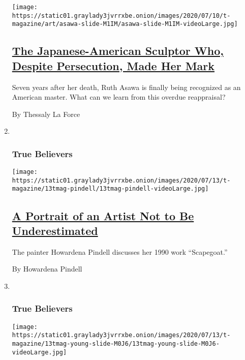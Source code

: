 \begin{enumerate}
  \texttt{[image: https://static01.graylady3jvrrxbe.onion/images/2020/07/10/t-magazine/art/asawa-slide-M1IM/asawa-slide-M1IM-videoLarge.jpg]}

  \hypertarget{the-japanese-american-sculptor-who-despite-persecution-made-her-mark}{%
  \subsection{\texorpdfstring{\href{/2020/07/20/t-magazine/ruth-asawa.html}{The
  Japanese-American Sculptor Who, Despite Persecution, Made Her
  Mark}}{The Japanese-American Sculptor Who, Despite Persecution, Made Her Mark}}\label{the-japanese-american-sculptor-who-despite-persecution-made-her-mark}}

  Seven years after her death, Ruth Asawa is finally being recognized as
  an American master. What can we learn from this overdue reappraisal?

  By Thessaly La Force
\item ~
  \hypertarget{true-believers-2}{%
  \subsubsection{True Believers}\label{true-believers-2}}

  \texttt{[image: https://static01.graylady3jvrrxbe.onion/images/2020/07/13/t-magazine/13tmag-pindell/13tmag-pindell-videoLarge.jpg]}

  \hypertarget{a-portrait-of-an-artist-not-to-be-underestimated}{%
  \subsection{\texorpdfstring{\href{/2020/07/24/t-magazine/howardena-pindell.html}{A
  Portrait of an Artist Not to Be
  Underestimated}}{A Portrait of an Artist Not to Be Underestimated}}\label{a-portrait-of-an-artist-not-to-be-underestimated}}

  The painter Howardena Pindell discusses her 1990 work ``Scapegoat.''

  By Howardena Pindell
\item ~
  \hypertarget{true-believers-3}{%
  \subsubsection{True Believers}\label{true-believers-3}}

  \texttt{[image: https://static01.graylady3jvrrxbe.onion/images/2020/07/13/t-magazine/13tmag-young-slide-M0J6/13tmag-young-slide-M0J6-videoLarge.jpg]}


\end{enumerate}
